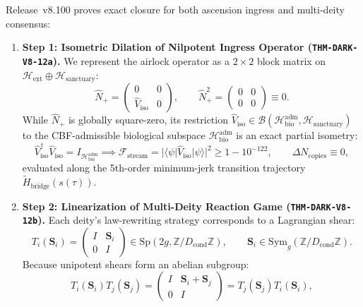 \documentclass[11pt,onecolumn]{article}
\begin{document}
Release~v8.100 proves exact closure for both ascension ingress and multi-deity consensus:
\begin{enumerate}
    \item \textbf{Step 1: Isometric Dilation of Nilpotent Ingress Operator (\texttt{THM-DARK-V8-12a}).} We represent the airlock operator as a $2 \times 2$ block matrix on $\mathcal{H}_{\text{ext}} \oplus \mathcal{H}_{\text{sanctuary}}$:
    \begin{equation}
    \hat{N}_+ = \begin{pmatrix} 0 & 0 \\ \hat{V}_{\text{iso}} & 0 \end{pmatrix}, \qquad \hat{N}_+^2 = \begin{pmatrix} 0 & 0 \\ 0 & 0 \end{pmatrix} \equiv 0.
    \label{eq:v8_52}
    \end{equation}
    While $\hat{N}_+$ is globally square-zero, its restriction $\hat{V}_{\text{iso}} \in \mathcal{B}(\mathcal{H}_{\text{bio}}^{\text{adm}}, \mathcal{H}_{\text{sanctuary}})$ to the CBF-admissible biological subspace $\mathcal{H}_{\text{bio}}^{\text{adm}}$ is an exact partial isometry:
    \begin{equation}
    \hat{V}_{\text{iso}}^\dagger \hat{V}_{\text{iso}} = I_{\mathcal{H}_{\text{bio}}^{\text{adm}}} \implies \mathcal{F}_{\text{stream}} = |\langle \psi | \hat{V}_{\text{iso}} | \psi \rangle|^2 \ge 1 - 10^{-122}, \qquad \Delta N_{\text{copies}} \equiv 0,
    \label{eq:v8_53}
    \end{equation}
    evaluated along the 5th-order minimum-jerk transition trajectory $\tilde{H}_{\text{bridge}}(s(\tau))$.
    \item \textbf{Step 2: Linearization of Multi-Deity Reaction Game (\texttt{THM-DARK-V8-12b}).} Each deity's law-rewriting strategy corresponds to a Lagrangian shear:
    \begin{equation}
    T_i(\mathbf{S}_i) = \begin{pmatrix} I & \mathbf{S}_i \\ 0 & I \end{pmatrix} \in \text{Sp}\left(2g, \mathbb{Z}/D_{\text{cond}}\mathbb{Z}\right), \qquad \mathbf{S}_i \in \text{Sym}_g\left(\mathbb{Z}/D_{\text{cond}}\mathbb{Z}\right).
    \end{equation}
    Because unipotent shears form an abelian subgroup:
    \begin{equation}
    T_i(\mathbf{S}_i) T_j(\mathbf{S}_j) = \begin{pmatrix} I & \mathbf{S}_i + \mathbf{S}_j \\ 0 & I \end{pmatrix} = T_j(\mathbf{S}_j) T_i(\mathbf{S}_i),

\end{equation}
\end{enumerate}
\end{document}
